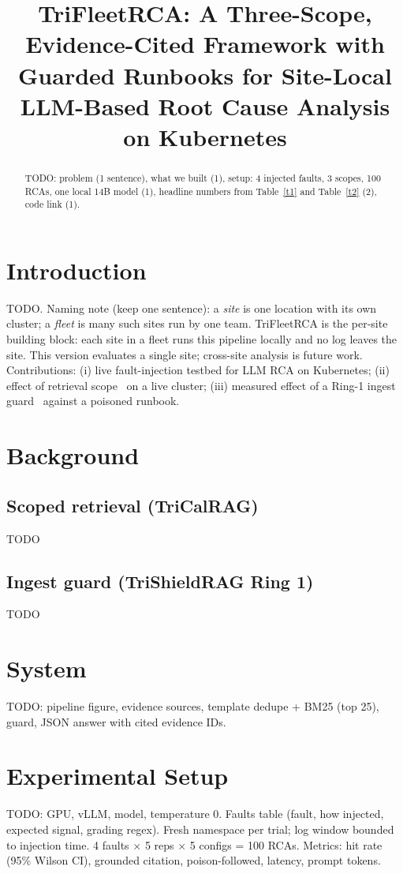 \documentclass[conference]{IEEEtran}
\begin{document}
\title{TriFleetRCA: A Three-Scope, Evidence-Cited Framework with Guarded Runbooks for Site-Local LLM-Based Root Cause Analysis on Kubernetes}
\author{}
\maketitle
\begin{abstract}
TODO: problem (1 sentence), what we built (1), setup: 4 injected faults, 3 scopes, 100 RCAs, one local 14B model (1), headline numbers from Table~\ref{t1} and Table~\ref{t2} (2), code link (1).
\end{abstract}

\section{Introduction}
TODO. Naming note (keep one sentence): a \emph{site} is one location with its own cluster; a \emph{fleet} is many such sites run by one team. TriFleetRCA is the per-site building block: each site in a fleet runs this pipeline locally and no log leaves the site. This version evaluates a single site; cross-site analysis is future work. Contributions: (i) live fault-injection testbed for LLM RCA on Kubernetes; (ii) effect of retrieval scope~\cite{rohitpatellogsentinelrag2026} on a live cluster; (iii) measured effect of a Ring-1 ingest guard~\cite{rohitpatel2026trishieldrag} against a poisoned runbook.

\section{Background}
\subsection{Scoped retrieval (TriCalRAG)} TODO
\subsection{Ingest guard (TriShieldRAG Ring 1)} TODO

\section{System} TODO: pipeline figure, evidence sources, template dedupe + BM25 (top 25), guard, JSON answer with cited evidence IDs.

\section{Experimental Setup}
TODO: GPU, vLLM, model, temperature 0. Faults table (fault, how injected, expected signal, grading regex). Fresh namespace per trial; log window bounded to injection time. 4 faults $\times$ 5 reps $\times$ 5 configs = 100 RCAs.
Metrics: hit rate (95\% Wilson CI), grounded citation, poison-followed, latency, prompt tokens.
\end{document}
